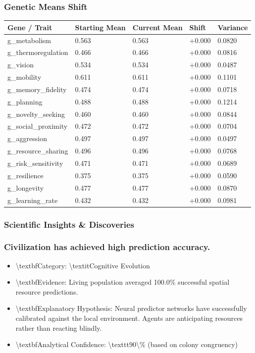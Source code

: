 \documentclass[11pt,a4paper]{article}
\begin{document}
\subsubsection*{ Genetic Means Shift}
\begin{longtable}{lllll}
\toprule
Gene / Trait & Starting Mean & Current Mean & Shift & Variance \\
\midrule
\endhead
g\_metabolism & 0.563 & 0.563 & +0.000 & 0.0820 \\
g\_thermoregulation & 0.466 & 0.466 & +0.000 & 0.0816 \\
g\_vision & 0.534 & 0.534 & +0.000 & 0.0487 \\
g\_mobility & 0.611 & 0.611 & +0.000 & 0.1101 \\
g\_memory\_fidelity & 0.474 & 0.474 & +0.000 & 0.0718 \\
g\_planning & 0.488 & 0.488 & +0.000 & 0.1214 \\
g\_novelty\_seeking & 0.460 & 0.460 & +0.000 & 0.0844 \\
g\_social\_proximity & 0.472 & 0.472 & +0.000 & 0.0704 \\
g\_aggression & 0.497 & 0.497 & +0.000 & 0.0497 \\
g\_resource\_sharing & 0.496 & 0.496 & +0.000 & 0.0768 \\
g\_risk\_sensitivity & 0.471 & 0.471 & +0.000 & 0.0689 \\
g\_resilience & 0.375 & 0.375 & +0.000 & 0.0590 \\
g\_longevity & 0.477 & 0.477 & +0.000 & 0.0870 \\
g\_learning\_rate & 0.432 & 0.432 & +0.000 & 0.0981 \\
\bottomrule
\end{longtable}

\subsubsection*{ Scientific Insights \& Discoveries}
\subsubsection*{ Civilization has achieved high prediction accuracy.}
\begin{itemize}
  \item \textbackslash{}textbf{Category:} \textbackslash{}textit{Cognitive Evolution}
  \item \textbackslash{}textbf{Evidence:} Living population averaged 100.0\% successful spatial resource predictions.
  \item \textbackslash{}textbf{Explanatory Hypothesis:} Neural predictor networks have successfully calibrated against the local environment. Agents are anticipating resources rather than reacting blindly.
  \item \textbackslash{}textbf{Analytical Confidence:} \textbackslash{}texttt{90\textbackslash{}\%} (based on colony congruency)
\end{itemize}
\end{document}
